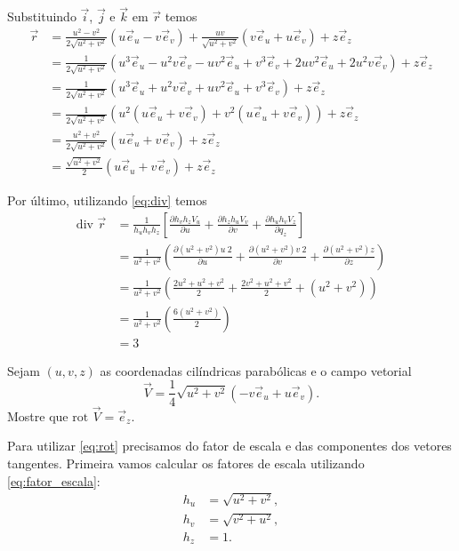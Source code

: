 \documentclass[a4paper,12pt, leqno, answers]{exam}
\newcommand{\devp}[2]{\frac{\partial #1}{\partial #2}}
\newcommand{\diver}{\mbox{div }}
\newcommand{\rot}{\mbox{rot }}
\begin{document}
\begin{questions}
\begin{solution}
        Substituindo $\vec{i}$, $\vec{j}$ e $\vec{k}$ em $\vec{r}$ temos
        \begin{align*}
            \vec{r} &= \frac{u^2 - v^2}{2 \sqrt{u^2 + v^2}} \left( u \vec{e}_u - v \vec{e}_v \right) + \frac{u v}{\sqrt{u^2 + v^2}} \left( v \vec{e}_u + u \vec{e}_v \right) + z \vec{e}_z \\
            &= \frac{1}{2 \sqrt{u^2 + v^2}} \left( u^3 \vec{e}_u - u^2 v \vec{e}_v - u v^2 \vec{e}_u + v^3 \vec{e}_v + 2 u v^2 \vec{e}_u + 2 u^2 v \vec{e}_v \right) + z \vec{e}_z \\
            &= \frac{1}{2 \sqrt{u^2 + v^2}} \left( u^3 \vec{e}_u + u^2 v \vec{e}_v + u v^2 \vec{e}_u + v^3 \vec{e}_v \right) + z \vec{e}_z \\
            &= \frac{1}{2 \sqrt{u^2 + v^2}} \left( u^2 \left( u \vec{e}_u + v \vec{e}_v \right) + v^2 \left( u \vec{e}_u + v \vec{e}_v \right) \right) + z \vec{e}_z \\
            &= \frac{u^2 + v^2}{2 \sqrt{u^2 + v^2}} \left( u \vec{e}_u + v \vec{e}_v \right) + z \vec{e}_z \\
            &= \frac{\sqrt{u^2 + v^2}}{2} \left( u \vec{e}_u + v \vec{e}_v \right) + z \vec{e}_z
        \end{align*}
        
        Por \'{u}ltimo, utilizando \eqref{eq:div} temos
        \begin{align*}
            \diver \vec{r} &= \frac{1}{h_u h_v h_z} \left[\devp{h_v h_z V_u}{u} + \devp{h_z h_u V_v}{v} + \devp{h_u h_v V_z}{q_z}\right] \\
            &= \frac{1}{u^2 + v^2} \left( \devp{\left( u^2 + v^2 \right) u \ 2}{u} + \devp{\left( u^2 + v^2 \right) v \ 2}{v} + \devp{\left( u^2 + v^2 \right) z}{z} \right) \\
            &= \frac{1}{u^2 + v^2} \left( \frac{2 u^2 + u^2 + v^2}{2} + \frac{2 v^2 + u^2 + v^2}{2} + \left( u^2 + v^2 \right) \right) \\
            &= \frac{1}{u^2 + v^2} \left( \frac{6 \left( u^2 + v^2 \right)}{2} \right) \\
            &= 3
        \end{align*}
    \end{solution}
  
    \question Sejam $(u, v, z)$ as coordenadas cil\'{i}ndricas parab\'{o}licas e o campo vetorial
    \[
    \vec{V} = \frac{1}{4} \sqrt{u^2 + v^2} (-v \vec{e}_u + u \vec{e}_v).
    \]
    Mostre que $\rot \vec{V} = \vec{e}_z$.
    \begin{solution}
        Para utilizar \eqref{eq:rot} precisamos do fator de escala e das componentes dos vetores tangentes. Primeira vamos calcular os fatores de escala utilizando \eqref{eq:fator_escala}:
        \begin{align*}
              h_u &= \sqrt{u^2 + v^2}, \\
              h_v &= \sqrt{v^2 + u^2}, \\
              h_z &= 1.
        \end{align*}
  

\end{solution}
\end{questions}
\end{document}
